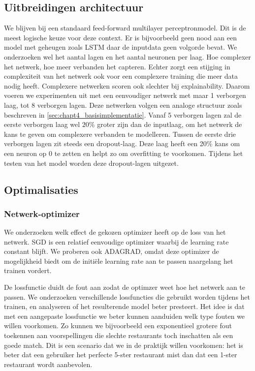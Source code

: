 


\subsection{Uitbreidingen architectuur}
We blijven bij een standaard feed-forward multilayer perceptronmodel. Dit is de meest logische keuze voor deze context. Er is bijvoorbeeld geen nood aan een model met geheugen zoals LSTM daar de inputdata geen volgorde bevat. 
We onderzoeken wel het aantal lagen en het aantal neuronen per laag. Hoe complexer het netwerk, hoe meer verbanden het capteren. Echter zorgt een stijging in complexiteit van het netwerk ook voor een complexere training die meer data nodig heeft. Complexere netwerken scoren ook slechter bij explainability. Daarom voeren we experimenten uit met een eenvoudiger netwerk met maar 1 verborgen laag, tot 8 verborgen lagen. Deze netwerken volgen een analoge structuur zoals beschreven in \autoref{sec:chapt4_basisimplementatie}. Vanaf 5 verborgen lagen zal de eerste verborgen laag wel $20$\% groter zijn dan de inputlaag, om het netwerk de kans te geven om complexere verbanden te modelleren. Tussen de eerste drie verborgen lagen zit steeds een dropout-laag. Deze laag heeft een 20\% kans om een neuron op 0 te zetten en helpt zo om overfitting te voorkomen. \cite{nn_dropout} Tijdens het testen van het model worden deze dropout-lagen uitgezet.

\subsection{Optimalisaties}
\subsubsection{Netwerk-optimizer}
We onderzoeken welk effect de gekozen optimizer heeft op de loss van het netwerk. SGD is een relatief eenvoudige optimizer waarbij de learning rate constant blijft. We proberen ook ADAGRAD, omdat deze optimizer de mogelijkheid biedt om de initiële learning rate aan te passen naargelang het trainen vordert.

De lossfunctie duidt de fout aan zodat de optimzer weet hoe het netwerk aan te passen. We onderzoeken verschillende lossfuncties die gebruikt worden tijdens het trainen, en analyseren of het resulterende model beter presteert. Het idee is dat met een aangepaste lossfunctie we beter kunnen aanduiden welk type fouten we willen voorkomen. Zo kunnen we bijvoorbeeld een exponentieel grotere fout toekennen aan voorspellingen die slechte restaurants toch inschatten als een goede match. Dit is een scenario dat we in de praktijk willen voorkomen: het is beter dat een gebruiker het perfecte 5-ster restaurant mist dan dat een 1-ster restaurant wordt aanbevolen.

